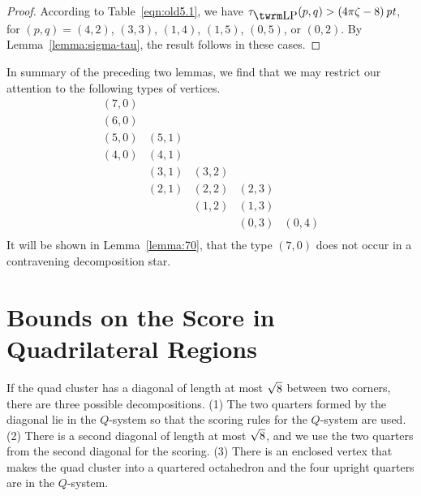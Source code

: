 
\begin{proof}  According to Table~\ref{eqn:old5.1},
we have $\tlp(p,q)> \squander$, for $(p,q) = (4,2)$, $(3,3)$,
$(1,4)$, $(1,5)$, $(0,5)$, or $(0,2)$. By
Lemma~\ref{lemma:sigma-tau}, the result follows in these cases.
\end{proof}



\begin{remark} \label{rem:pq-list}
In summary of the preceding two lemmas, we find that we may
restrict our attention to the following types of vertices.
    $$
    \begin{matrix}
   (7,0)&      &       &       &       \\
   (6,0)&      &       &       &       \\
   (5,0)&(5,1) &       &       &       \\
   (4,0)&(4,1) &       &       &       \\
        &(3,1) &(3,2)  &       &       \\
        &(2,1) &(2,2)  &(2,3)  &       \\
        &      &(1,2)  &(1,3)  &       \\
        &      &       &(0,3)  &(0,4)  \\
    \end{matrix}
    $$
It will be shown in Lemma~\ref{lemma:70}, that the type $(7,0)$
does not occur in a contravening decomposition star.
\end{remark}


\section{Bounds on the Score in Quadrilateral Regions}
    \label{sec:bounds}

If the quad cluster has a diagonal of length at most $\sqrt8$
between two corners, there are three possible decompositions. (1)
The two quarters formed by the diagonal lie in the $Q$-system so
that the scoring rules for the $Q$-system are used.  (2) There is
a second diagonal of length at most $\sqrt8$, and we use the two
quarters from the second diagonal for the scoring. (3) There is an
enclosed vertex that makes the quad cluster into a quartered
octahedron and the four upright quarters are in the $Q$-system.

